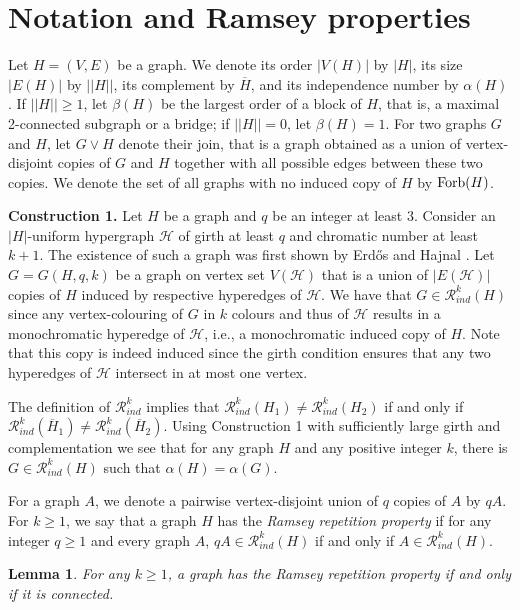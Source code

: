 \documentclass[11pt]{article}
\theoremstyle{plain}
\newtheorem{lemma}[theorem]{Lemma}
\theoremstyle{definition}
\newcommand{\cH}{\mathcal{H}}
\newcommand{\R}{\mathcal{R}}
\newcommand{\Forb}{{\rm Forb}}
\newcommand{\Rk}{\R_{ind}}
\begin{document}
   
 \section{Notation and Ramsey properties}\label{sec:notations}
Let $H=(V, E)$ be a graph. We denote its order  $|V(H)|$ by $|H|$, its size $|E(H)|$ by $||H||$, its complement by $\overline{H}$, and 
its independence number by  $\alpha(H)$. If $||H||\geq 1$, let $\beta(H)$ be the largest order of a block of $H$, that is, a maximal 2-connected subgraph or a bridge; if $||H||=0$, let $\beta(H)=1$. For two graphs $G$ and $H$, let $G\vee H$ denote their join, that is a graph obtained as a union of vertex-disjoint copies of $G$ and $H$ together with all possible edges between these two copies.
 We denote the set of all graphs with no induced copy of $H$ by $\Forb(H)$.
 
 
 {\bf Construction 1.} Let $H$ be a graph and $q$ be an integer at least $3$.  Consider an  $|H|$-uniform hypergraph $\cH$ of girth at least $q$ and chromatic number at least $k+1$. The existence of such a graph was first shown by Erd\H{o}s and Hajnal \cite{EH}.
 Let $G=G(H, q, k)$ be a graph on vertex set $V(\cH)$ that is a union of $|E(\cH)|$ copies of $H$ induced by respective hyperedges of $\cH$. 
 We have that $G\in \Rk^k(H)$ since any vertex-colouring of $G$ in $k$ colours  and thus of $\cH$ results in a monochromatic hyperedge of $\cH$, i.e., a monochromatic induced copy of $H$. Note that this copy is indeed induced since the girth condition ensures that any two hyperedges of $\cH$ intersect in at most one vertex.

The definition of $\Rk^k$ implies that  $\R_{ind}^k(H_1) \neq \R_{ind}^k(H_2)$ if and only if $\R_{ind}^k(\overline{H}_1) \neq \R_{ind}^k(\overline{H}_2)$.
Using Construction 1 with sufficiently large girth and complementation we see  that for any graph $H$  and any positive integer $k$, there is $G \in \R_{ind}^k(H)$ such that $\alpha(H)=\alpha(G)$.
  
   
For a graph $A$, we denote a pairwise vertex-disjoint union of $q$ copies of $A$ by $qA$.  For $k\geq 1$, we say that a graph $H$ has  the  {\it Ramsey repetition property} if for any  integer $q \geq1$ and every graph $A$,   $ qA\in\Rk^k(H)$ if and only if $A\in\Rk^k(H).$
 \begin{lemma}\label{repetition}
For any $k\geq 1$, a  graph has the Ramsey repetition property if and only if it is connected.
\end{lemma}
\end{document}
